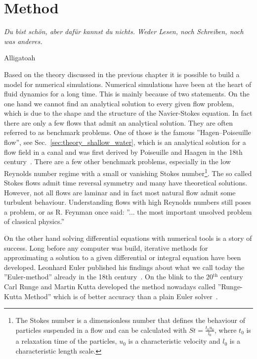 \chapter{Method}
\label{chapter:method}
\epigraph{\textit{Du bist schön, aber dafür kannst du nichts.
Weder Lesen, noch Schreiben, noch was anderes.}}{Alligatoah}
Based on the theory discussed in the previous chapter it is possible to build a model for numerical simulations.
Numerical simulations have been at the heart of fluid dynamics for a long time.
This is mainly because of two statements.
On the one hand we cannot find an analytical solution to every given flow problem, which is due to the shape and the structure of the Navier-Stokes equation.
In fact there are only a few flows that admit an analytical solution. 
They are often referred to as benchmark problems.
One of those is the famous ''Hagen–Poiseuille flow'', see  Sec.~\ref{sec:theory_shallow_water}, which is an analytical solution for a flow field in a canal and was first derived by Poiseuille and Haagen in the 18th century~\cite{suteraHistoryPoiseuilleLaw}.
There are a few other benchmark problems, especially in the low Reynolds number regime with a small or vanishing Stokes number\footnote{The Stokes number is a dimensionless number that defines the behaviour of particles suspended in a flow and can be calculated with $St = \frac{t_0u_0}{l_0}$, where $t_0$ is a relaxation time of the particles, $u_0$ is a characteristic velocity and $l_0$ is a characteristic length scale.}.
The so called Stokes flows admit time reversal symmetry and many have theoretical solutions.
However, not all flows are laminar and in fact most natural flow admit some turbulent behaviour. 
Understanding flows with high Reynolds numbers still poses a problem, or as R. Feynman once said: ''... the most important unsolved problem of classical physics.''

On the other hand solving differential equations with numerical tools is a story of success.
Long before any computer was build, iterative methods for approximating a solution to a given differential or integral equation have been developed.
Leonhard Euler published his findings about what we call today the ''Euler-method'' already in the 18th century~\cite{brezinskiNumericalAnalysisHistorical2012}.
On the blink to the 20$^{\text{th}}$ century Carl Runge and Martin Kutta developed the method nowadays called ''Runge-Kutta Method'' which is of better accuracy than a plain Euler solver~\cite{wBeitragZurNaherungsweisen1901, rungeUeberNumerischeAufloesung1895}.

